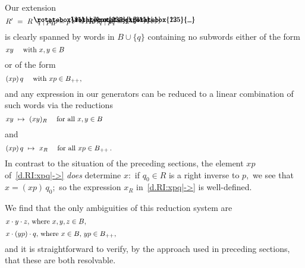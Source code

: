 \documentclass{amsart}
\DeclareRobustCommand{\lang}{\begin{picture}(5,7)
\put(1.2,2.5){\rotatebox{45}{\line(1,0){6.0}}}
\put(1.2,2.5){\rotatebox{315}{\line(1,0){6.0}}}
\end{picture}\kern.16em}
\DeclareRobustCommand{\rang}{\kern.1em\begin{picture}(5,7)
\put(.1,2.5){\rotatebox{135}{\line(1,0){6.0}}}
\put(.1,2.5){\rotatebox{225}{\line(1,0){6.0}}}
\end{picture}}
\begin{document}
Our extension
\begin{equation}\begin{minipage}[c]{35pc}\label{d.RI:R'}
$R'\ =\ R\lang q\mid pqp=p\rang\ =\ R\lang q\mid pq=1\rang$
\end{minipage}\end{equation}
is clearly spanned by words in $B\cup\{q\}$ containing no
subwords either of the form
\begin{equation}\begin{minipage}[c]{35pc}\label{d.RI:xy}
$xy$ \quad with $x,y\in B$
\end{minipage}\end{equation}
or of the form
\begin{equation}\begin{minipage}[c]{35pc}\label{d.RI:xpq}
$(xp)\,q$ \quad with $xp\in B_{++},$
\end{minipage}\end{equation}
and any expression in our
generators can be reduced to a linear combination of
such words via the reductions
\begin{equation}\begin{minipage}[c]{35pc}\label{d.RI:xy|->}
$xy\ \mapsto\ (xy)_R$ \quad for all $x,y\in B$
\end{minipage}\end{equation}
and
\begin{equation}\begin{minipage}[c]{35pc}\label{d.RI:xpq|->}
$(xp)\,q\ \mapsto\ x_R$ \quad for all $xp\in B_{++}\,.$
\end{minipage}\end{equation}
In contrast to the situation of the preceding
sections, the element $xp$ of~\eqref{d.RI:xpq|->}
{\em does} determine $x:$ if $q_0\in R$ is a right inverse to $p,$
we see that $x=(xp)\,q_0;$ so the expression $x_R$
in~\eqref{d.RI:xpq|->} is well-defined.

We find that the only ambiguities of this reduction system are
\begin{equation}\begin{minipage}[c]{35pc}\label{d.RI:xyz}
$x\cdot y\cdot z,$ where $x,y,z\in B,$
\end{minipage}\end{equation}
\begin{equation}\begin{minipage}[c]{35pc}\label{d.RI:xypq}
$x\cdot (yp) \cdot q,$ where
$x\in B,$ $yp\in B_{++},$
\end{minipage}\end{equation}
and it is straightforward to verify, by the approach used
in preceding sections, that these are both resolvable.
\end{document}
